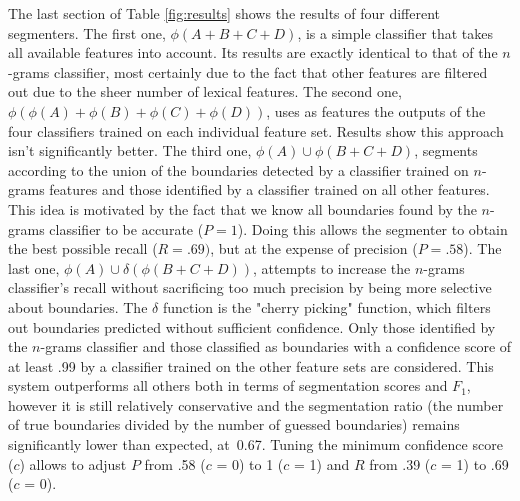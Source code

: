 The last section of Table \ref{fig:results} shows the results of four different segmenters. The first one, $\phi(A + B + C + D)$, is a simple classifier that takes all available features into account. Its results are exactly identical to that of the $n$-grams classifier, most certainly due to the fact that other features are filtered out due to the sheer number of lexical features. The second one, $\phi(\phi(A) + \phi(B) + \phi(C) + \phi(D))$, uses as features the outputs of the four classifiers trained on each individual feature set. Results show this approach isn't significantly better. The third one, $\phi(A) \cup \phi(B + C + D)$, segments according to the union of the boundaries detected by a classifier trained on $n$-grams features and those identified by a classifier trained on all other features. This idea is motivated by the fact that we know all boundaries found by the $n$-grams classifier to be accurate ($P=1$). Doing this allows the segmenter to obtain the best possible recall ($R=.69)$, but at the expense of precision ($P=.58$). The last one, $\phi(A) \cup \delta(\phi(B + C + D))$, attempts to increase the $n$-grams classifier's recall without sacrificing too much precision by being more selective about boundaries. The $\delta$ function is the "cherry picking" function, which filters out boundaries predicted without sufficient confidence. Only those identified by the $n$-grams classifier and those classified as boundaries with a confidence score of at least .99 by a classifier trained on the other feature sets are considered. This system outperforms all others both in terms of segmentation scores and $F_1$, however it is still relatively conservative and the segmentation ratio (the number of true boundaries divided by the number of guessed boundaries) remains significantly lower than expected, at~0.67. Tuning the minimum confidence score ($c$) allows to adjust $P$ from .58 ($c$ = 0) to 1 ($c$ = 1) and $R$ from .39 ($c$ = 1) to .69 ($c$ = 0).